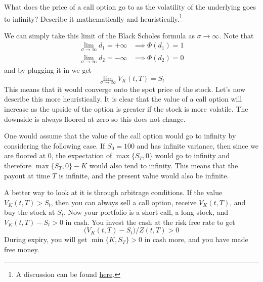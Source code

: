 \documentclass{article}
\begin{document}
    \begin{exercise}
      What does the price of a call option go to as the volatility of the underlying goes to infinity? Describe it mathematically and heuristically.\footnote{A discussion can be found \href{https://quant.stackexchange.com/questions/39490/value-of-call-option-as-volatility-goes-to-infinity}{here}. } 
    \end{exercise}

    \begin{solution}
      We can simply take this limit of the Black Scholes formula as $\sigma \rightarrow \infty$. Note that 
      \begin{align}
        \lim_{\sigma \rightarrow \infty} d_1 = + \infty & \implies \Phi(d_1) = 1 \\ 
        \lim_{\sigma \rightarrow \infty} d_2 = - \infty & \implies \Phi(d_2) = 0
      \end{align}
      and by plugging it in we get 
      \begin{equation}
        \lim_{\sigma \rightarrow \infty} V_K (t, T) = S_t 
      \end{equation}
      This means that it would converge onto the spot price of the stock. Let's now describe this more heuristically. It is clear that the value of a call option will increase as the upside of the option is greater if the stock is more volatile. The downside is always floored at zero so this does not change. 

      One would assume that the value of the call option would go to infinity by considering the following case. If $S_0 = 100$ and has infinite variance, then since we are floored at $0$, the expectation of $\max\{S_T, 0\}$ would go to infinity and therefore $\max\{S_T, 0\} - K$ would also tend to infinity. This means that the payout at time $T$ is infinite, and the present value would also be infinite. 

      A better way to look at it is through arbitrage conditions. If the value $V_K (t, T) > S_t$, then you can always sell a call option, receive $V_K(t, T)$, and buy the stock at $S_t$. Now your portfolio is a short call, a long stock, and $V_K (t, T) - S_t > 0$ in cash. You invest the cash at the risk free rate to get 
      \begin{equation}
        \big( V_K (t, T) - S_t \big) / Z(t, T) > 0
      \end{equation}
      During expiry, you will get $\min\{K, S_T\} > 0$ in cash more, and you have made free money. 
    \end{solution}
\end{document}
